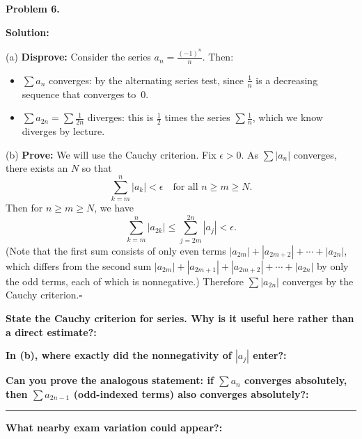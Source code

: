 \documentclass[12pt]{article}
\newcommand{\fillfield}[1]{%
  \par\noindent\textbf{#1:}\enspace\hrulefill\par\vspace{3pt}%
}
\newcommand{\fillfieldlong}[1]{%
  \par\noindent\textbf{#1:}\par\vspace{1.5cm}%
  \noindent\rule{\linewidth}{0.35pt}\par\vspace{4pt}%
}
\begin{document}
\newpage

\begin{tcolorbox}[
  enhanced, breakable,
  colback  = solgreen,
  colframe = green!45!black,
  fonttitle = \bfseries,
  title = {\textsc{Official Solution}\hfill Homework 7 -- Solutions}
]
\textbf{Problem 6.}

\medskip\textbf{Solution:}

\medskip
(a) \textbf{Disprove:} Consider the series $a_n = \frac{(-1)^n}{n}$.
Then:
\begin{itemize}[nosep, leftmargin=1.5em]
  \item $\sum a_n$ converges: by the alternating series test, since $\frac{1}{n}$ is a
    decreasing sequence that converges to~$0$.
  \item $\sum a_{2n} = \sum \frac{1}{2n}$ diverges: this is $\frac{1}{2}$ times the
    series $\sum \frac{1}{n}$, which we know diverges by lecture.
\end{itemize}

\medskip
(b) \textbf{Prove:} We will use the Cauchy criterion.
Fix $\epsilon > 0$.
As $\sum |a_n|$ converges, there exists an $N$ so that
\[
  \sum_{k=m}^{n} |a_k| < \epsilon \quad\text{for all } n \geq m \geq N.
\]
Then for $n \geq m \geq N$, we have
\[
  \sum_{k=m}^{n} |a_{2k}| \leq \sum_{j=2m}^{2n} |a_j| < \epsilon.
\]
(Note that the first sum consists of only even terms
$|a_{2m}| + |a_{2m+2}| + \cdots + |a_{2n}|$,
which differs from the second sum
$|a_{2m}| + |a_{2m+1}| + |a_{2m+2}| + \cdots + |a_{2n}|$
by only the odd terms, each of which is nonneg\-ative.)
Therefore $\sum |a_{2n}|$ converges by the Cauchy criterion.\hfill$\square$
\end{tcolorbox}

\bigskip

\begin{tcolorbox}[
  enhanced, breakable,
  colback  = reflectcyan,
  colframe = cyan!55!black,
  fonttitle = \bfseries,
  title = {\textsc{Reflection \& Variation}}
]
\fillfield{State the Cauchy criterion for series. Why is it useful here rather than a direct estimate?}
\fillfield{In (b), where exactly did the nonneg\-ativity of $|a_j|$ enter?}
\fillfieldlong{Can you prove the analogous statement: if $\sum a_n$ converges absolutely, then $\sum a_{2n-1}$ (odd-indexed terms) also converges absolutely?}
\fillfield{What nearby exam variation could appear?}
\end{tcolorbox}

\newpage
\end{document}
